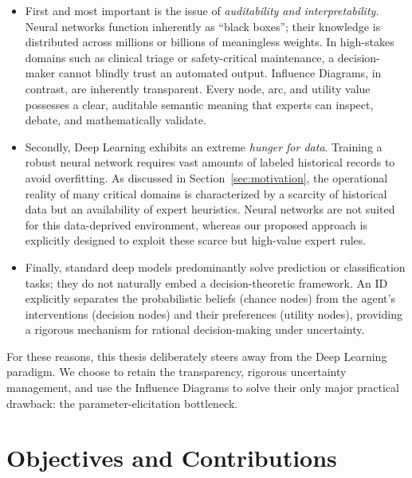 \begin{itemize}
    \item First and most important is the issue of \emph{auditability and interpretability}. Neural networks function inherently as ``black boxes''; their knowledge is distributed across millions or billions of meaningless weights. In high-stakes domains such as clinical triage or safety-critical maintenance, a decision-maker cannot blindly trust an automated output. Influence Diagrams, in contrast, are inherently transparent. Every node, arc, and utility value possesses a clear, auditable semantic meaning that experts can inspect, debate, and mathematically validate.

    \item Secondly, Deep Learning exhibits an extreme \emph{hunger for data}. Training a robust neural network requires vast amounts of labeled historical records to avoid overfitting. As discussed in Section~\ref{sec:motivation}, the operational reality of many critical domains is characterized by a scarcity of historical data but an availability of expert heuristics. Neural networks are not suited for this data-deprived environment, whereas our proposed approach is explicitly designed to exploit these scarce but high-value expert rules.

    \item Finally, standard deep models predominantly solve prediction or classification tasks; they do not naturally embed a decision-theoretic framework. An ID explicitly separates the probabilistic beliefs (chance nodes) from the agent's interventions (decision nodes) and their preferences (utility nodes), providing a rigorous mechanism for rational decision-making under uncertainty. 
\end{itemize}

For these reasons, this thesis deliberately steers away from the Deep Learning paradigm. We choose to retain the transparency, rigorous uncertainty management, and use the Influence Diagrams to solve their only major practical drawback: the parameter-elicitation bottleneck.


\section{Objectives and Contributions}

